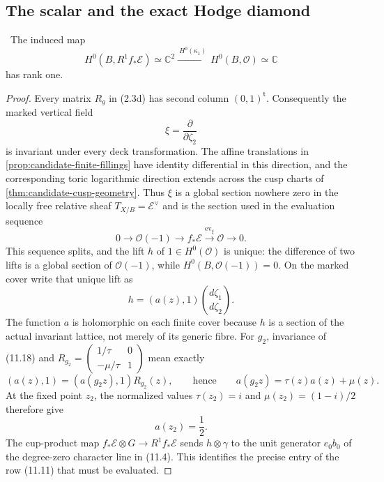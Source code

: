 \subsection{The scalar and the exact Hodge diamond}

\begin{theorem}
\label{thm:h12-scalar}
\Verified\ The induced map
\[
 H^0(B,R^1f_*\mathcal E)\simeq\mathbb C^2
 \xrightarrow{\ H^0(\kappa_1)\ }
 H^0(B,\mathcal O)\simeq\mathbb C
\]
has rank one.
\end{theorem}

\begin{proof}
Every matrix $R_g$ in (2.3d) has second column $(0,1)^{\mathsf t}$.
Consequently the marked vertical field
\[
 \xi=\frac{\partial}{\partial\zeta_2}
\]
is invariant under every deck transformation.  The affine translations in
\cref{prop:candidate-finite-fillings} have identity differential in this
direction, and the corresponding toric logarithmic direction extends across
the cusp charts of \cref{thm:candidate-cusp-geometry}.  Thus $\xi$ is a
global section nowhere zero in the locally free relative sheaf
$T_{X/B}=\mathcal E^\vee$ and is the section used in the evaluation sequence
\[
 0\longrightarrow\mathcal O(-1)\longrightarrow f_*\mathcal E
 \xrightarrow{\operatorname{ev}_\xi}\mathcal O\longrightarrow0.
\]
This sequence splits, and the lift $h$ of $1\in H^0(\mathcal O)$ is unique:
the difference of two lifts is a global section of $\mathcal O(-1)$, while
$H^0(B,\mathcal O(-1))=0$.  On the marked cover write that unique lift as
\[
 h=(a(z),1)\binom{d\zeta_1}{d\zeta_2}.
\tag{11.18}
\]
The function $a$ is holomorphic on each finite cover because $h$ is a
section of the actual invariant lattice, not merely of its generic fibre.
For $g_2$, invariance of (11.18) and
$R_{g_2}=\left(\begin{smallmatrix}1/\tau&0\\-\mu/\tau&1\end{smallmatrix}\right)$
mean exactly
\[
 (a(z),1)=(a(g_2z),1)R_{g_2}(z),
 \qquad\text{hence}\qquad
 a(g_2z)=\tau(z)a(z)+\mu(z).
\tag{11.18a}
\]
At the fixed point $z_2$, the normalized values
$\tau(z_2)=i$ and $\mu(z_2)=(1-i)/2$ therefore give
\[
 a(z_2)=\frac12.
\tag{11.18b}
\]
The cup-product map
$f_*\mathcal E\otimes G\to R^1f_*\mathcal E$ sends
$h\otimes\gamma$ to the unit generator $e_0b_0$ of the degree-zero
character line in (11.4).  This identifies the precise entry of the row
(11.11) that must be evaluated.


\end{proof}

